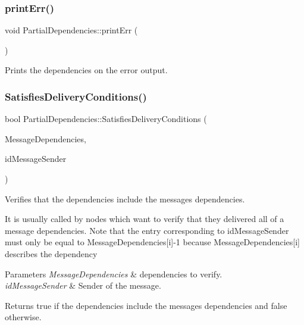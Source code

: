 \mbox{\label{class_partial_dependencies_ac4c98e7d381b9e9efa54a094d1da729d}} 
\subsubsection{\texorpdfstring{print\+Err()}{printErr()}}
{\footnotesize\ttfamily void Partial\+Dependencies\+::print\+Err (\begin{DoxyParamCaption}{ }\end{DoxyParamCaption})}



Prints the dependencies on the error output. 

\mbox{\label{class_partial_dependencies_a67a733dba9069541f83fecee520ccce1}} 
\subsubsection{\texorpdfstring{Satisfies\+Delivery\+Conditions()}{SatisfiesDeliveryConditions()}}
{\footnotesize\ttfamily bool Partial\+Dependencies\+::\+Satisfies\+Delivery\+Conditions (\begin{DoxyParamCaption}\item[{const \hyperlink{class_partial_dependencies}{Partial\+Dependencies} \&}]{Message\+Dependencies,  }\item[{unsigned int}]{id\+Message\+Sender }\end{DoxyParamCaption})}



Verifies that the dependencies include the message\textquotesingle{}s dependencies. 

It is usually called by nodes which want to verify that they delivered all of a message dependencies. Note that the entry corresponding to id\+Message\+Sender must only be equal to Message\+Dependencies\mbox{[}i\mbox{]}-\/1 because Message\+Dependencies\mbox{[}i\mbox{]} describes the dependency 
\begin{DoxyParams}{Parameters}
{\em Message\+Dependencies} & dependencies to verify. \\
\hline
{\em id\+Message\+Sender} & Sender of the message. \\
\hline
\end{DoxyParams}
\begin{DoxyReturn}{Returns}
true if the dependencies include the message\textquotesingle{}s dependencies and false otherwise. 
\end{DoxyReturn}
\mbox{\label{class_partial_dependencies_ad60f5e87d6d7e027c399bd1a8206a952}} 
